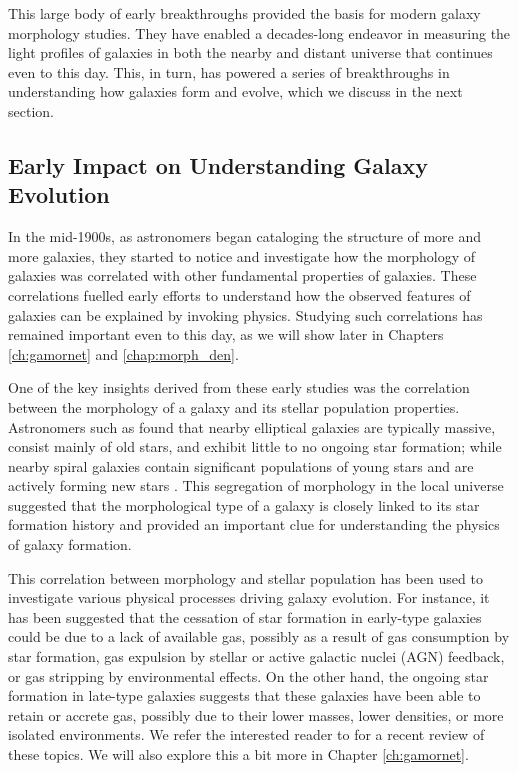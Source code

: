 This large body of early breakthroughs provided the basis for modern galaxy morphology studies. They have enabled a decades-long endeavor in measuring the light profiles of galaxies in both the nearby and distant universe that continues even to this day. This, in turn, has powered a series of breakthroughs in understanding how galaxies form and evolve, which we discuss in the next section. 

\subsection{Early Impact on Understanding Galaxy Evolution} \label{sec_intro:gal_evo}
In the mid-1900s, as astronomers began cataloging the structure of more and more galaxies, they started to notice and investigate how the morphology of galaxies was correlated with other fundamental properties of galaxies. These correlations fuelled early efforts to understand how the observed features of galaxies can be explained by invoking physics. Studying such correlations has remained important even to this day, as we will show later in Chapters \ref{ch:gamornet} and \ref{chap:morph_den}.

One of the key insights derived from these early studies was the correlation between the morphology of a galaxy and its stellar population properties. Astronomers such as \citeauthor{holmberg_58} found that nearby elliptical galaxies are typically massive, consist mainly of old stars, and exhibit little to no ongoing star formation; while nearby spiral galaxies contain significant populations of young stars and are actively forming new stars \citep{holmberg_58}. This segregation of morphology in the local universe  suggested that the morphological type of a galaxy is closely linked to its star formation history and provided an important clue for understanding the physics of galaxy formation.

This correlation between morphology and stellar population has been used to investigate various physical processes driving galaxy evolution. For instance, it has been suggested that the cessation of star formation in early-type galaxies could be due to a lack of available gas, possibly as a result of gas consumption by star formation, gas expulsion by stellar or active galactic nuclei (AGN) feedback, or gas stripping by environmental effects. On the other hand, the ongoing star formation in late-type galaxies suggests that these galaxies have been able to retain or accrete gas, possibly due to their lower masses, lower densities, or more isolated environments. We refer the interested reader to \citet{morph_review} for a recent review of these topics. We will also explore this a bit more in Chapter \ref{ch:gamornet}.

